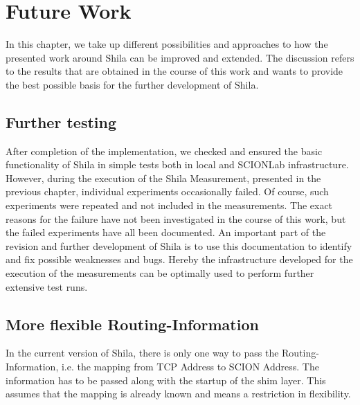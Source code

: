 \chapter{Future Work}
\label{chap:FutureWork}

In this chapter, we take up different possibilities and approaches to how the presented work around Shila can be improved and extended. The discussion refers to the results that are obtained in the course of this work and wants to provide the best possible basis for the further development of Shila.

\section*{Further testing}

After completion of the implementation, we checked and ensured the basic functionality of Shila in simple tests both in local and SCIONLab infrastructure. However, during the execution of the Shila Measurement, presented in the previous chapter, individual experiments occasionally failed. Of course, such experiments were repeated and not included in the measurements. The exact reasons for the failure have not been investigated in the course of this work, but the failed experiments have all been documented. An important part of the revision and further development of Shila is to use this documentation to identify and fix possible weaknesses and bugs. Hereby the infrastructure \cite{} developed for the execution of the measurements can be optimally used to perform further extensive test runs.

\section*{More flexible Routing-Information}

In the current version of Shila, there is only one way to pass the Routing-Information, i.e. the mapping from TCP Address to SCION Address. The information has to be passed along with the startup of the shim layer. This assumes that the mapping is already known and means a restriction in flexibility.  

